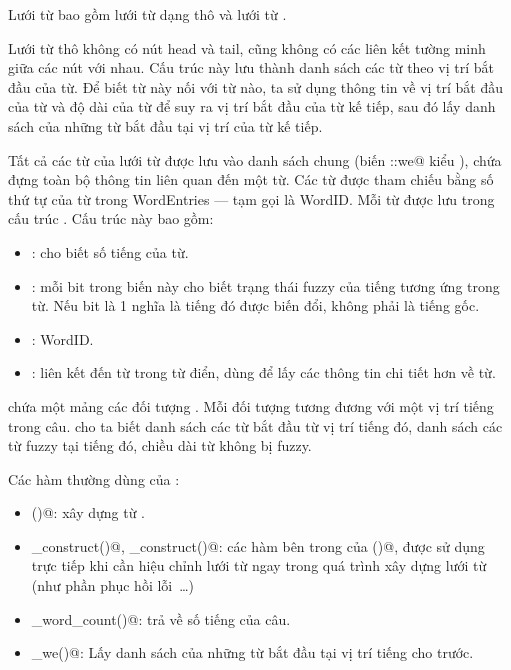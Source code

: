 \documentclass[a4paper,oneside,14pt]{extbook} %
\begin{document}
Lưới từ bao gồm lưới từ dạng thô \verb@Lattice@ và lưới từ \verb@DAG@.

Lưới từ thô \verb@Lattice@ không có nút head và tail, cũng không có các
liên kết tường minh giữa các nút với nhau. Cấu trúc này lưu thành danh
sách các từ theo vị trí bắt đầu của từ. Để biết từ này nối với từ nào,
ta sử dụng thông tin về vị trí bắt đầu của từ và độ dài của từ để suy
ra vị trí bắt đầu của từ kế tiếp, sau đó lấy danh sách của những từ
bắt đầu tại vị trí của từ kế tiếp.

Tất cả các từ của lưới từ được lưu vào danh sách chung (biến
\verb@Lattice::we@ kiểu \verb@WordEntries@), chứa đựng toàn bộ thông tin
liên quan đến một từ. Các từ được tham chiếu bằng số thứ tự của từ
trong WordEntries --- tạm gọi là WordID. Mỗi từ được lưu trong cấu
trúc \verb@WordEntry@. Cấu trúc này bao gồm:
\begin{itemize}
\item \verb@len@: cho biết số tiếng của từ.
\item \verb@fuzid@: mỗi bit trong biến này cho biết trạng thái fuzzy
  của tiếng tương ứng trong từ. Nếu bit là 1 nghĩa là tiếng đó được
  biến đổi, không phải là tiếng gốc.
\item \verb@id@: WordID.
\item \verb@node@: liên kết đến từ trong từ điển, dùng để lấy các
  thông tin chi tiết hơn về từ.
\end{itemize}

\verb@Lattice@ chứa một mảng các đối tượng \verb@WordInfos@. Mỗi đối
tượng \verb@WordInfo@ tương đương với một vị trí tiếng trong
câu. \verb@WordInfos@ cho ta biết danh sách các từ bắt đầu từ vị trí
tiếng đó, danh sách các từ fuzzy tại tiếng đó, chiều dài từ không bị
fuzzy. 

Các hàm thường dùng của \verb@Lattice@:
\begin{itemize}
\item \verb@construct()@: xây dựng \verb@Lattice@ từ \verb@Sentence@.
\item \verb@pre_construct()@, \verb@post_construct()@: các hàm bên
  trong của \verb@construct()@, được sử dụng trực tiếp khi cần hiệu
  chỉnh lưới từ ngay trong quá trình xây dựng lưới từ (như phần phục
  hồi lỗi~\ldots)
\item \verb@get_word_count()@: trả về số tiếng của câu.
\item \verb@get_we()@: Lấy danh sách \verb@WordEntry@ của những từ bắt
  đầu tại vị trí tiếng cho trước.
\end{itemize}
\end{document}
